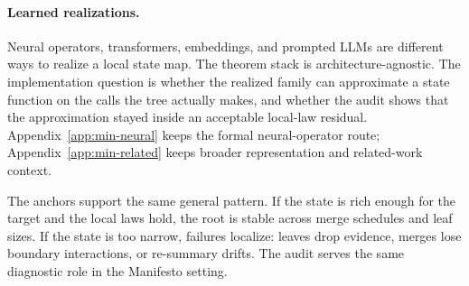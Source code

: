 \paragraph{Learned realizations.}
Neural operators, transformers, embeddings, and prompted LLMs are different
ways to realize a local state map. The theorem stack is architecture-agnostic.
The implementation question is whether the realized family can approximate a
state function on the calls the tree actually makes, and whether the audit
shows that the approximation stayed inside an acceptable local-law residual.
Appendix~\ref{app:min-neural} keeps the formal neural-operator route;
Appendix~\ref{app:min-related} keeps broader representation and related-work
context.

The anchors support the same general pattern. If the state is rich enough for
the target and the local laws hold, the root is stable across merge schedules
and leaf sizes. If the state is too narrow, failures localize: leaves drop
evidence, merges lose boundary interactions, or re-summary drifts. The audit
serves the same diagnostic role in the Manifesto setting.
